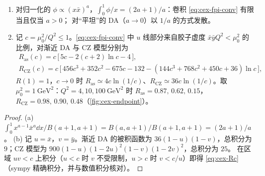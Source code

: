 \begin{proposition}[端点收敛性与软胶子区域的权重]\label{prop:cex-endpoint}
\begin{enumerate}[label=(\alph*)]
\item 对归一化的 $\phi\propto(x\bar x)^a$，$\int_0^1\phi/x=(2a+1)/a$：卷积 \cref{eq:cex-fpi-conv} 有限当且仅当 $a>0$；
对“平坦”的 DA（$a\to0$）以 $1/a$ 的方式发散。
\item 记 $c=\mu_0^2/Q^2\le1$。\cref{eq:cex-fpi-conv} 中 $u$ 线部分来自胶子虚度 $\bar x\bar yQ^2<\mu_0^2$ 的比例，对渐近 DA 与 CZ 模型分别为
\begin{equation}\label{eq:cex-Rc}
\begin{gathered}
R_{\mathrm{as}}(c)=c\,\big[\,5c-2(c+2)\ln c-4\,\big],\\
R_{\mathrm{CZ}}(c)=c\,\big[\,456c^3+352c^2-675c-132-(144c^3+768c^2+450c+36)\ln c\,\big],
\end{gathered}
\end{equation}
$R(1)=1$，$c\to0$ 时 $R_{\mathrm{as}}\simeq4c\ln(1/c)$、$R_{\mathrm{CZ}}\simeq36c\ln(1/c)$。取 $\mu_0^2=1\ \mathrm{GeV}^2$：$Q^2=4,10,100\ \mathrm{GeV}^2$ 时
$R_{\mathrm{as}}=0.87,\,0.62,\,0.15$，$R_{\mathrm{CZ}}=0.98,\,0.90,\,0.48$（\cref{fig:cex-endpoint}）。
\end{enumerate}
\end{proposition}

\begin{proof}
(a) $\int_0^1x^{a-1}\bar x^a\dd x/B(a+1,a+1)=B(a,a+1)/B(a+1,a+1)=(2a+1)/a$。
(b) 记 $u=\bar x$，$v=\bar y$。渐近 DA 的被积函数为 $36(1-u)(1-v)$，总积分为 $9$；CZ 模型为 $900(1-u)(1-2u)^2(1-v)(1-2v)^2$，总积分为 $25$。
在区域 $uv<c$ 上积分（$u<c$ 时 $v$ 不受限制，$u>c$ 时 $v<c/u$）即得 \cref{eq:cex-Rc}（sympy 精确积分，并与数值积分核对）。
\end{proof}

